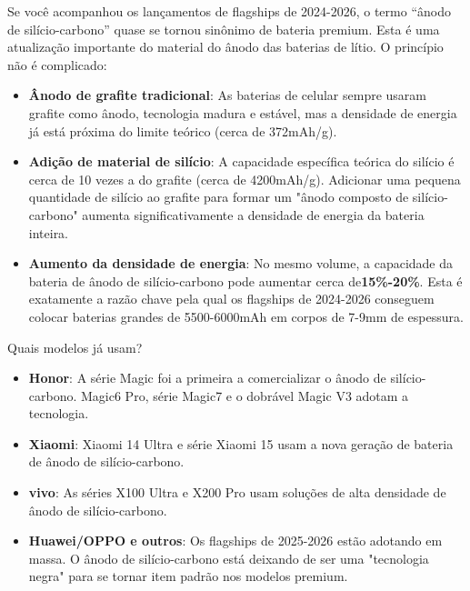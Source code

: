 
Se você acompanhou os lançamentos de flagships de 2024-2026, o termo “ânodo de silício-carbono” quase se tornou sinônimo de bateria premium. Esta é uma atualização importante do material do ânodo das baterias de lítio. O princípio não é complicado:

\begin{itemize}
  \item \textbf{Ânodo de grafite tradicional}: As baterias de celular sempre usaram grafite como ânodo, tecnologia madura e estável, mas a densidade de energia já está próxima do limite teórico (cerca de 372mAh/g).
  \item \textbf{Adição de material de silício}: A capacidade específica teórica do silício é cerca de 10 vezes a do grafite (cerca de 4200mAh/g). Adicionar uma pequena quantidade de silício ao grafite para formar um "ânodo composto de silício-carbono" aumenta significativamente a densidade de energia da bateria inteira.
  \item \textbf{Aumento da densidade de energia}: No mesmo volume, a capacidade da bateria de ânodo de silício-carbono pode aumentar cerca de\textbf{15\%-20\%}. Esta é exatamente a razão chave pela qual os flagships de 2024-2026 conseguem colocar baterias grandes de 5500-6000mAh em corpos de 7-9mm de espessura.
\end{itemize}

\begin{tcbinfo}{Quais modelos já usam?}
\begin{itemize}
  \item \textbf{Honor}: A série Magic foi a primeira a comercializar o ânodo de silício-carbono. Magic6 Pro, série Magic7 e o dobrável Magic V3 adotam a tecnologia.
  \item \textbf{Xiaomi}: Xiaomi 14 Ultra e série Xiaomi 15 usam a nova geração de bateria de ânodo de silício-carbono.
  \item \textbf{vivo}: As séries X100 Ultra e X200 Pro usam soluções de alta densidade de ânodo de silício-carbono.
  \item \textbf{Huawei/OPPO e outros}: Os flagships de 2025-2026 estão adotando em massa. O ânodo de silício-carbono está deixando de ser uma "tecnologia negra" para se tornar item padrão nos modelos premium.
\end{itemize}

\end{tcbinfo}

